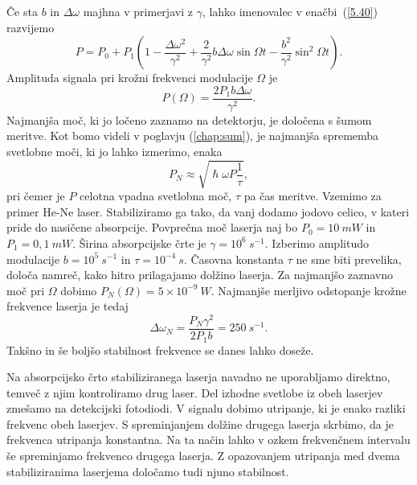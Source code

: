 Če sta $b$ in $\Delta\omega$ majhna v
primerjavi z $\gamma$, lahko imenovalec v enačbi~(\ref{5.40})
razvijemo
\begin{equation}  
\label{5.42}
P=P_0+P_1 \left(1-\frac{\Delta\omega^2}{\gamma^2} +\frac{2}{\gamma^2} b
\Delta\omega \sin\Omega t - \frac{b^2}{\gamma^2}\sin^2\Omega t\right).
\end{equation}
Amplituda signala pri krožni frekvenci modulacije $\Omega$ je 
\begin{equation}
P(\Omega) = \frac{2P_1 b \Delta\omega}{\gamma^2}. 
\end{equation}
Najmanjša moč, ki jo ločeno zaznamo na detektorju, je določena s šumom 
meritve. Kot bomo videli v poglavju (\ref{chap:sum}), je najmanjša 
sprememba svetlobne moči, ki jo lahko izmerimo, enaka 
\begin{equation}  
\label{5.43}
P_N\approx \sqrt{\hslash\omega P \frac{1}{\tau}},
\end{equation}
pri čemer je $P$ celotna vpadna svetlobna moč, $\tau$ pa čas
meritve. Vzemimo za primer He-Ne laser. Stabiliziramo ga tako,
da vanj dodamo jodovo celico, v kateri pride do nasičene absorpcije.
Povprečna moč laserja naj bo $P_0 = 10~\si{mW}$ in $P_1= 0,1~\si{mW}$. 
Širina absorpcijske črte je $\gamma= 10^6~\si{s}^{-1}$. Izberimo amplitudo 
modulacije $b=10^5~\si{s}^{-1}$ in $\tau=10^{-4}~\si{s}$. Časovna konstanta 
$\tau$ ne sme biti prevelika, določa namreč, kako hitro prilagajamo dolžino 
laserja. Za najmanjšo zaznavno moč pri $\Omega$ dobimo 
$P_N(\Omega) = 5\times10^{-9}~\si{W}$.
Najmanjše merljivo odstopanje krožne frekvence laserja je tedaj 
\begin{equation}  
\label{5.44}
\Delta\omega_N=\frac{P_N \gamma^2}{2P_1 b}=250~\si{s}^{-1}.
\end{equation}
Takšno in še boljšo stabilnost frekvence se danes lahko doseže. 

\begin{remark}
Na absorpcijsko črto stabiliziranega laserja navadno ne uporabljamo
direktno, temveč z njim kontroliramo drug laser. Del izhodne svetlobe iz
obeh laserjev zmešamo na detekcijski fotodiodi. V signalu dobimo utripanje,
ki je enako razliki frekvenc obeh laserjev. S spreminjanjem dolžine drugega
laserja skrbimo, da je frekvenca utripanja konstantna. Na ta način lahko v
ozkem frekvenčnem intervalu še spreminjamo frekvenco drugega laserja.
Z opazovanjem utripanja med dvema stabiliziranima laserjema določamo tudi
njuno stabilnost.
\end{remark}


